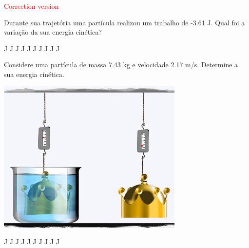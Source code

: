 \documentclass[12pt, addpoints]{exam}
\begin{document}
\begin{center}
\textcolor{red}{\emph\Large Correction version}\end{center}
\begin{questions}
\begin{multicols}{2}
\question[33] Durante sua trajetória uma partícula realizou um trabalho de   -3.61 J. Qual foi a variação da sua energia cinética?

\begin{oneparchoices}
 J J J J J J J J J J\end{oneparchoices}

\begin{oneparchoices}
\end{oneparchoices}
\question[23] Considere uma partícula de massa    7.43 kg e velocidade    2.17 m/s. Determine a sua energia cinética.

\begin{center}
\begin{minipage}[c]{0.75\linewidth}
\includegraphics[width=\textwidth]{MWE001.jpg}
\end{minipage}

\end{center}
\begin{oneparchoices}
 J J J J J J J J J J\end{oneparchoices}

\begin{oneparchoices}
\end{oneparchoices}
\end{multicols}
\end{questions}
\end{document}
